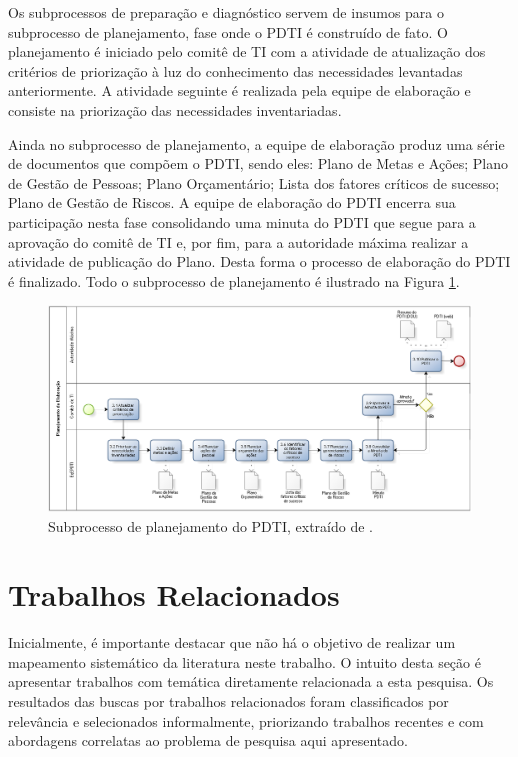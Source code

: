Os subprocessos de preparação e diagnóstico servem de insumos para o subprocesso de planejamento, fase onde o PDTI é construído de fato. O planejamento é iniciado pelo comitê de TI com a atividade de atualização dos critérios de priorização à luz do conhecimento das necessidades levantadas anteriormente. A atividade seguinte é realizada pela equipe de elaboração e consiste na priorização das necessidades inventariadas.

Ainda no subprocesso de planejamento, a equipe de elaboração produz uma série de documentos que compõem o PDTI, sendo eles: Plano de Metas e Ações; Plano de Gestão de Pessoas; Plano Orçamentário; Lista dos fatores críticos de sucesso; Plano de Gestão de Riscos. A equipe de elaboração do PDTI encerra sua participação nesta fase consolidando uma minuta do PDTI que segue para a aprovação do comitê de TI e, por fim, para a autoridade máxima realizar a atividade de publicação do Plano. Desta forma o processo de elaboração do PDTI é finalizado. Todo o subprocesso de planejamento é ilustrado na Figura \ref{figura:pdti04Planejamento}.
\begin{figure}[h!]
\centering %
\includegraphics[width=16cm]{figuras/pdti04Planejamento.png}
\caption{Subprocesso de planejamento do PDTI, extraído de \cite{sisp:15}.}
\label{figura:pdti04Planejamento}
\end{figure}

\section{Trabalhos Relacionados}


Inicialmente, é importante destacar que não há o objetivo de realizar um mapeamento sistemático da literatura neste trabalho. O intuito desta seção é apresentar trabalhos com temática diretamente relacionada a esta pesquisa. Os resultados das buscas por trabalhos relacionados foram classificados por relevância e selecionados informalmente, priorizando trabalhos recentes e com abordagens correlatas ao problema de pesquisa aqui apresentado.

